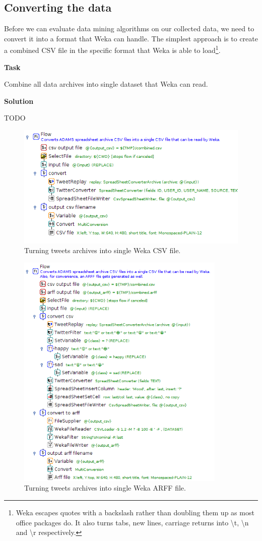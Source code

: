 \documentclass[a4paper,10pt]{book}
\newcommand{\heading}[1]{
  \vspace{0.3cm} \noindent \textbf{#1} \newline
}
\begin{document}
\subsection{Converting the data}
Before we can evaluate data mining algorithms on our collected data, we need to convert it into a format that Weka can handle. The simplest approach is to create a combined CSV file in the specific format that Weka is able to load\footnote{Weka escapes quotes with a backslash rather than doubling them up as most office packages do. It also turns tabs, new lines, carriage returns into \textbackslash t, \textbackslash n and \textbackslash r respectively.}.

\heading{Task}
Combine all data archives into single dataset that Weka can read.

\heading{Solution}
TODO

\begin{figure}[htb]
  \centering
  \includegraphics[width=12.0cm]{images/csv_archive_to_weka_csv-flow.png}
  \caption{Turning tweets archives into single Weka CSV file.}
  \label{csv_archive_to_weka_csv-flow}
\end{figure}

\begin{figure}[htb]
  \centering
  \includegraphics[width=10.0cm]{images/csv_archive_to_arff-flow.png}
  \caption{Turning tweets archives into single Weka ARFF file.}
  \label{csv_archive_to_arff-flow}
\end{figure}
\end{document}

